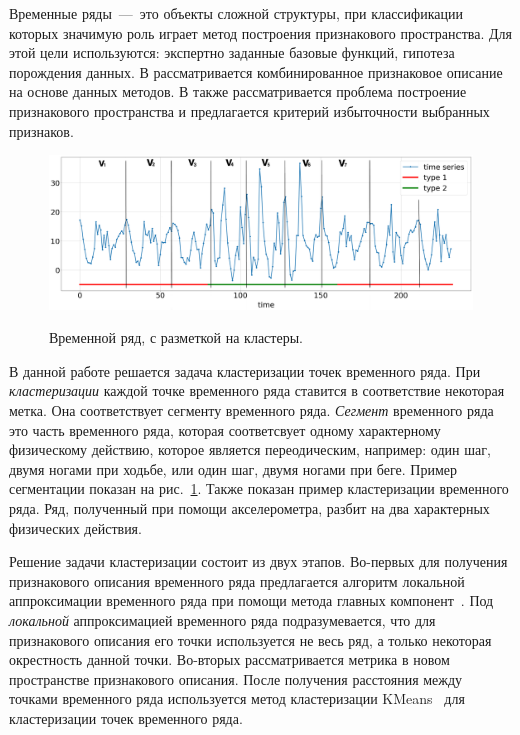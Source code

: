 \documentclass[12pt, twoside]{article}
\numberwithin{equation}{section}
\begin{document}
Временные ряды~---~это объекты сложной структуры, при классификации которых значимую роль играет метод построения признакового пространства. Для этой цели используются: экспертно заданные базовые функций, гипотеза порождения данных. В \cite{Ivkin2015} рассматривается комбинированное признаковое описание на основе данных методов. В \cite{Katrutsa2015} также рассматривается проблема построение признакового пространства и предлагается критерий избыточности выбранных признаков.

\begin{figure}[h!t]\center
\includegraphics[width=1\textwidth]{results/example}\\
\caption{Временной ряд, с разметкой на кластеры.}
\label{example_1}
\end{figure}

В данной работе решается задача кластеризации точек временного ряда. При \textit{кластеризации} каждой точке временного ряда ставится в соответствие некоторая метка. Она соответствует сегменту временного ряда. \textit{Сегмент} временного ряда это часть временного ряда, которая соответсвует одному характерному физическому действию, которое является переодическим, например: один шаг, двумя ногами при ходьбе, или один шаг, двумя ногами при беге. Пример сегментации показан на  рис.~\ref{example_1}. Также показан пример кластеризации временного ряда. Ряд, полученный при помощи акселерометра, разбит на два характерных физических действия.

Решение задачи кластеризации состоит из двух этапов. Во-первых для получения признакового описания временного ряда предлагается алгоритм локальной аппроксимации временного ряда при помощи метода главных компонент~\cite{Shiglavsi1997}. Под \textit{локальной} аппроксимацией временного ряда подразумевается, что для признакового описания его точки используется не весь ряд, а только некоторая окрестность данной точки. Во-вторых рассматривается метрика в новом пространстве признакового описания. После получения расстояния между точками временного ряда используется метод кластеризации KMeans~\cite{Kanungo2000} для кластеризации точек временного ряда.
\end{document}
